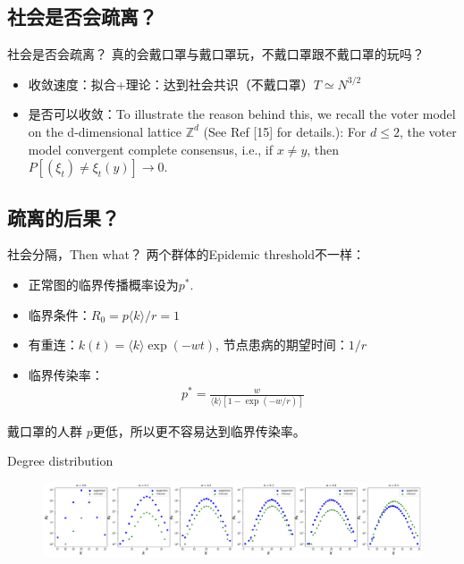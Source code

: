 \documentclass{beamer}
\begin{document}
\subsection{社会是否会疏离？}
\begin{frame}{社会是否会疏离？}
真的会戴口罩与戴口罩玩，不戴口罩跟不戴口罩的玩吗？
    \begin{itemize}
        \item 收敛速度：拟合+理论：达到社会共识（不戴口罩）$T \simeq N^{3/2}$
        \item 是否可以收敛：To illustrate the reason behind this, we recall the voter model on the d-dimensional lattice $\mathbb{Z}^d$ (See Ref [15] for details.): For $d \le 2$, the voter model convergent complete consensus, i.e., if $x\ne y$, then $P[(\xi_t)\ne \xi_t(y)]\to 0$.
    \end{itemize}
\end{frame}

\subsection{疏离的后果？}
\begin{frame}{社会分隔，Then what？}
两个群体的Epidemic threshold不一样：
\begin{itemize}
    \item 正常图的临界传播概率设为$p^*$.
    \item 临界条件：$R_0 = p\langle k \rangle / r = 1$
    \item 有重连：$k(t) = \langle k \rangle\exp(-wt)$, 节点患病的期望时间：$1/r$
    \item 临界传染率：\begin{align*}
        p^* = \frac{w}{\langle k \rangle[1-\exp(-w/r)]}
    \end{align*}
\end{itemize}
\begin{center}
    戴口罩的人群 $p$更低，所以更不容易达到临界传染率。
\end{center}
\end{frame}

\begin{frame}{Degree distribution}
    \begin{figure}
        \centering
        \includegraphics[width = 0.5\linewidth]{figs/degreedistsi.png}
    \end{figure}
\end{frame}
\end{document}
